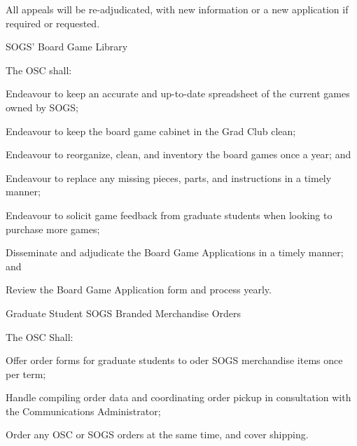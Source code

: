 \begin{longenum}[ label*=\thesubsection.\arabic*., align=left]
\begin{longenum}[label*=\arabic*., align=left]
\begin{longenum}[label*=\arabic*., align=left]
\begin{longenum}[label*=\arabic*., align=left]
\begin{longenum}[label*=\arabic*., align=left]
\begin{longenum}[label*=\arabic*., align=left]
						\end{longenum}						
					\item All appeals will be re-adjudicated, with new information or a new application if required or requested.
					\end{longenum}
				\end{longenum}
			\end{longenum}
		\end{longenum}
\item SOGS' Board Game Library
		\begin{longenum}[label*=\arabic*., align=left]
		\item The OSC shall:
			\begin{longenum}[label*=\arabic*., align=left]
			\item Endeavour to keep an accurate and up-to-date spreadsheet of the current games owned by SOGS;
			\item Endeavour to keep the board game cabinet in the Grad Club clean;
			\item Endeavour to reorganize, clean, and inventory the board games once a year; and
				\begin{longenum}[label*=\arabic*., align=left]
				\item Endeavour to replace any missing pieces, parts, and instructions in a timely manner;
				\end{longenum}
			\item Endeavour to solicit game feedback from graduate students when looking to purchase more games;
			\item Disseminate and adjudicate the Board Game Applications in a timely manner; and
			\item Review the Board Game Application form and process yearly.
			\end{longenum}
		\end{longenum}
\item Graduate Student SOGS Branded Merchandise Orders
		\begin{longenum}[label*=\arabic*., align=left]
		\item The OSC Shall:
			\begin{longenum}[label*=\arabic*., align=left]
			\item Offer order forms for graduate students to oder SOGS merchandise items once per term;
			\item Handle compiling order data and coordinating order pickup in consultation with the Communications Administrator;
			\item Order any OSC or SOGS orders at the same time, and cover shipping.
			\end{longenum}
		\end{longenum}
\end{longenum}

